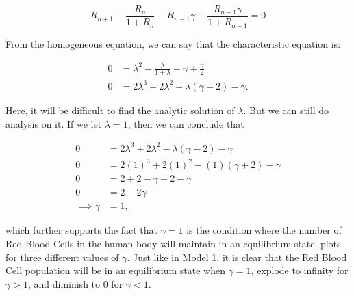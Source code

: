 \begin{equation*}
    R_{n+1} - \frac{R_n}{1 + R_n} - R_{n-1}\gamma + \frac{R_{n-1}\gamma}{1+R_{n-1}} = 0
\end{equation*}

From the homogeneous equation, we can say that the characteristic equation is:

\begin{align}
    0 &= \lambda^2 - \frac{\lambda}{1 + \lambda} - \gamma + \frac{\gamma}{2} \nonumber\\
    0 &= 2\lambda^3+2\lambda^2-\lambda(\gamma+2)-\gamma. \label{eq:2nonlinear-difference-model-characteristic-equation}
\end{align}

Here, it will be difficult to find the analytic solution of $\lambda$. But we can still do analysis on it. If we let $\lambda = 1$, then we can conclude that

\begin{align}
    0 &= 2\lambda^3 + 2\lambda^2 - \lambda(\gamma + 2) - \gamma \nonumber\\
    0 &= 2(1)^3 + 2(1)^2 - (1)(\gamma+2) - \gamma \nonumber\\
    0 &= 2 + 2 - \gamma - 2 - \gamma \nonumber\\
    0 &= 2 - 2\gamma \nonumber\\
    \implies \gamma &= 1, \label{eq:nonlinear-difference-model-param-val}
\end{align}

which further supports the fact that $\gamma = 1$ is the condition where the number of Red Blood Cells in the human body will maintain in an equilibrium state.  plots  for three different values of $\gamma$. Just like in Model 1, it is clear that the Red Blood Cell population will be in an equilibrium state when $\gamma = 1$, explode to infinity for $\gamma > 1$, and diminish to 0 for $\gamma < 1$.
